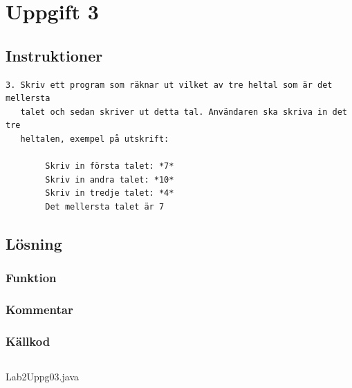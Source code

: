 \section{Uppgift 3}\label{sec:uppg03}

\subsection{Instruktioner}
\begin{verbatim}
3. Skriv ett program som räknar ut vilket av tre heltal som är det mellersta
   talet och sedan skriver ut detta tal. Användaren ska skriva in det tre
   heltalen, exempel på utskrift:

        Skriv in första talet: *7*
        Skriv in andra talet: *10*
        Skriv in tredje talet: *4*
        Det mellersta talet är 7
\end{verbatim}

\subsection{Lösning}
%
%
%
%     
\subsubsection{Funktion}

\subsubsection{Kommentar}


\subsubsection{Källkod}
\inputminted[linenos]{java}{src/Lab2Uppg03.java}
\caption{Lab2Uppg03.java}
\label{src:uppg03}


